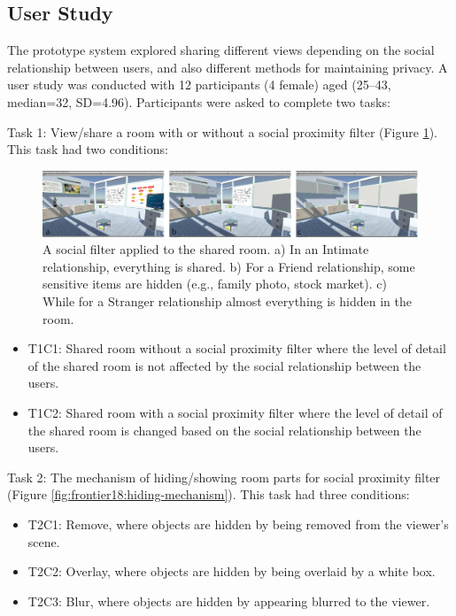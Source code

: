 \subsection{User Study}

The prototype system explored sharing different views depending on the social relationship between users, and also different methods for maintaining privacy. A user study was conducted with 12 participants (4 female) aged (25–43, median=32, SD=4.96). Participants were asked to complete two tasks: 

Task 1: View/share a room with or without a social proximity filter (Figure \ref{fig:frontier18:social-filter}). This task had two conditions: 

\begin{figure}[H]
    \begin{center}
    \includegraphics[width=\linewidth]{images/frontier18/images-02.png}
    \caption{A social filter applied to the shared room. a) In an Intimate relationship, everything is shared. b) For a Friend relationship, some sensitive items are hidden (e.g., family photo, stock market). c) While for a Stranger relationship almost everything is hidden in the room.}\label{fig:frontier18:social-filter}
    \end{center}
\end{figure}


\begin{itemize}
    \item T1C1: Shared room without a social proximity filter where the level of detail of the shared room is not affected by the social relationship between the users.
    \item T1C2: Shared room with a social proximity filter where the level of detail of the shared room is changed based on the social relationship between the users. 
\end{itemize}

Task 2: The mechanism of hiding/showing room parts for social proximity filter (Figure \ref{fig:frontier18:hiding-mechanism}). This task had three conditions:

\begin{itemize}
\item T2C1: Remove, where objects are hidden by being removed from the viewer's scene.
\item T2C2: Overlay, where objects are hidden by being overlaid by a white box. 
\item T2C3: Blur, where objects are hidden by appearing blurred to the viewer. 
\end{itemize}

